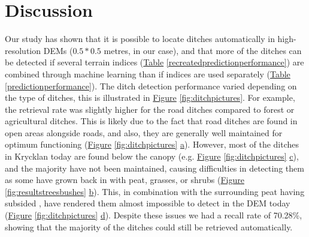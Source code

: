 \documentclass[11pt, review]{elsarticle} %
\begin{document}
\section{Discussion}

Our study has shown that it is possible to locate ditches automatically in high-resolution DEMs ($0.5  * 0.5 $ metres, in our case), and that more of the ditches can be detected if several terrain indices (\hyperref[recreatedpredictionperformance]{Table} \ref{recreatedpredictionperformance}) are combined through machine learning than if indices are used separately (\hyperref[predictionperformance]{Table} \ref{predictionperformance}).
The ditch detection performance varied depending on the type of ditches, this is illustrated in \hyperref[fig:ditchpictures]{Figure} \ref{fig:ditchpictures}. For example, the retrieval rate was slightly higher for the road ditches compared to forest or agricultural ditches. This is likely due to the fact that  road ditches are found in open areas alongside roads, and also,   they are generally well maintained for optimum functioning (\hyperref[fig:ditchpictures]{Figure} \ref{fig:ditchpictures} \hyperref[fig:ditchpictures]{a}). However, most of the ditches in Krycklan today are found below the canopy (e.g. \hyperref[fig:ditchpictures]{Figure} \ref{fig:ditchpictures} \hyperref[fig:ditchpictures]{c}), and the majority have not been maintained, causing difficulties in detecting them as some have grown back in with peat, grasses, or shrubs (\hyperref[fig:resultstreesbushes]{Figure} \ref{fig:resultstreesbushes} \hyperref[fig:resultstreesbushes]{b}). This, in combination with the surrounding peat having subsided \citep{heikurainen}, have rendered them almost impossible to detect in the DEM today (\hyperref[fig:ditchpictures]{Figure} \ref{fig:ditchpictures} \hyperref[fig:ditchpictures]{d}). Despite these issues we had a recall rate of 70.28\%, showing that the majority of the ditches could still be retrieved automatically.
\end{document}

